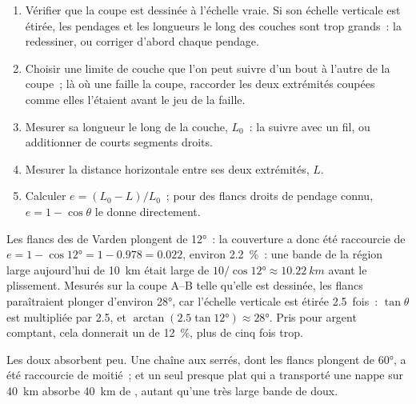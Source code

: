 \begin{method}\label{met:g12:mountain-building:shortening}
\begin{enumerate}
  \item Vérifier que la coupe est dessinée à l'échelle vraie. Si son
        échelle verticale est étirée, les pendages et les longueurs le long
        des couches sont trop grands~: la redessiner, ou corriger d'abord
        chaque pendage.
  \item Choisir une limite de couche que l'on peut suivre d'un bout à
        l'autre de la coupe~; là où une faille la coupe, raccorder les deux
        extrémités coupées comme elles l'étaient avant le jeu de la faille.
  \item Mesurer sa longueur le long de la couche, $L_0$~: la suivre avec un
        fil, ou additionner de courts segments droits.
  \item Mesurer la distance horizontale entre ses deux extrémités, $L$.
  \item Calculer $e = (L_0 - L)/L_0$~; pour des flancs droits de pendage
        connu, $e = 1 - \cos\theta$ le donne directement.
\end{enumerate}
\end{method}

\begin{example}\label{ex:g12:mountain-building:varden}
Les flancs des  de Varden plongent de \ang{12}~: la couverture a donc
été raccourcie de $e = 1 - \cos\ang{12} = 1 - 0.978 = 0.022$, environ
\qty{2.2}{\percent}~: une bande de la région large aujourd'hui de
\qty{10}{km} était large de $10/\cos\ang{12} \approx
\qty{10.22}{km}$ avant le plissement. Mesurés sur la coupe A--B telle
qu'elle est dessinée, les flancs paraîtraient plonger d'environ \ang{28},
car l'échelle verticale est étirée 2.5~fois~: $\tan\theta$ est multipliée
par 2.5, et $\arctan(2.5
\tan\ang{12}) \approx \ang{28}$. Pris pour argent comptant, cela donnerait
un  de \qty{12}{\percent}, plus de cinq fois trop.
\end{example}

Les  doux absorbent peu. Une chaîne aux  serrés, dont les flancs
plongent de \ang{60}, a été raccourcie de moitié~; et un seul 
presque plat qui a transporté une nappe sur \qty{40}{km} absorbe
\qty{40}{km} de , autant qu'une très large bande de 
doux.

